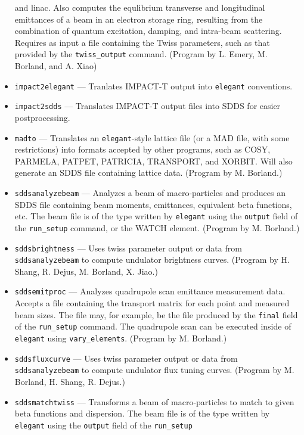 \documentclass[11pt]{article}
\begin{document}
\begin{itemize}
        and linac. Also computes the equlibrium transverse and longitudinal emittances of a 
        beam in an electron storage ring, resulting from the combination of quantum excitation,
        damping, and intra-beam scattering.  Requires as input a file containing the
        Twiss parameters, such as that provided by the \verb|twiss_output| command.
        (Program by L. Emery, M. Borland, and A. Xiao)
\item {\tt impact2elegant} --- Tranlates IMPACT-T \cite{IMPACT} output into {\tt elegant} conventions.
\item {\tt impact2sdds} --- Translates IMPACT-T output files into SDDS for easier postprocessing.
\item {\tt madto} --- Translates an {\tt elegant}-style lattice file (or a MAD file, with
        some restrictions) into formats accepted by other programs, such as COSY, PARMELA, 
        PATPET, PATRICIA, TRANSPORT, and XORBIT.  Will also generate an SDDS file containing lattice
        data.  (Program by M. Borland.)
\item {\tt sddsanalyzebeam} --- Analyzes a beam of macro-particles and produces an SDDS file
        containing beam moments, emittances, equivalent beta functions, etc.  The beam file
        is of the type written by {\tt elegant} using the {\tt output} field of the {\tt run\_setup}
        command, or the WATCH element.  (Program by M. Borland.)
\item {\tt sddsbrightness} --- Uses twiss parameter output or data from {\tt sddsanalyzebeam} to
  compute undulator brightness curves.  (Program by H. Shang, R. Dejus, M. Borland, X. Jiao.)
\item {\tt sddsemitproc} --- Analyzes quadrupole scan emittance measurement data.  Accepts a
        file containing the transport matrix for each point and measured beam sizes.  
        The file may, for example, be the file produced
        by the {\tt final} field of the {\tt run\_setup} command.  The quadrupole scan can be
        executed inside of {\tt elegant} using {\tt vary\_elements}. (Program by M. Borland.)
\item {\tt sddsfluxcurve} --- Uses twiss parameter output or data from {\tt sddsanalyzebeam} to
  compute undulator flux tuning curves.  (Program by M. Borland, H. Shang, R. Dejus.)
\item {\tt sddsmatchtwiss} --- Transforms a beam of macro-particles to match to given beta
        functions and dispersion.    The beam file
        is of the type written by {\tt elegant} using the {\tt output} field of the {\tt run\_setup}

\end{itemize}
\end{document}
